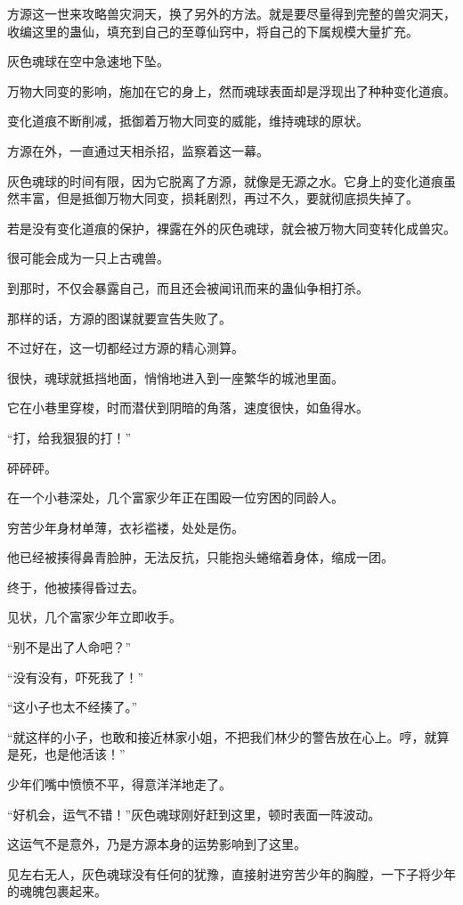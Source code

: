\begin{this_body}
方源这一世来攻略兽灾洞天，换了另外的方法。就是要尽量得到完整的兽灾洞天，收编这里的蛊仙，填充到自己的至尊仙窍中，将自己的下属规模大量扩充。

灰色魂球在空中急速地下坠。

万物大同变的影响，施加在它的身上，然而魂球表面却是浮现出了种种变化道痕。

变化道痕不断削减，抵御着万物大同变的威能，维持魂球的原状。

方源在外，一直通过天相杀招，监察着这一幕。

灰色魂球的时间有限，因为它脱离了方源，就像是无源之水。它身上的变化道痕虽然丰富，但是抵御万物大同变，损耗剧烈，再过不久，要就彻底损失掉了。

若是没有变化道痕的保护，裸露在外的灰色魂球，就会被万物大同变转化成兽灾。

很可能会成为一只上古魂兽。

到那时，不仅会暴露自己，而且还会被闻讯而来的蛊仙争相打杀。

那样的话，方源的图谋就要宣告失败了。

不过好在，这一切都经过方源的精心测算。

很快，魂球就抵挡地面，悄悄地进入到一座繁华的城池里面。

它在小巷里穿梭，时而潜伏到阴暗的角落，速度很快，如鱼得水。

“打，给我狠狠的打！”

砰砰砰。

在一个小巷深处，几个富家少年正在围殴一位穷困的同龄人。

穷苦少年身材单薄，衣衫褴褛，处处是伤。

他已经被揍得鼻青脸肿，无法反抗，只能抱头蜷缩着身体，缩成一团。

终于，他被揍得昏过去。

见状，几个富家少年立即收手。

“别不是出了人命吧？”

“没有没有，吓死我了！”

“这小子也太不经揍了。”

“就这样的小子，也敢和接近林家小姐，不把我们林少的警告放在心上。哼，就算是死，也是他活该！”

少年们嘴中愤愤不平，得意洋洋地走了。

“好机会，运气不错！”灰色魂球刚好赶到这里，顿时表面一阵波动。

这运气不是意外，乃是方源本身的运势影响到了这里。

见左右无人，灰色魂球没有任何的犹豫，直接射进穷苦少年的胸膛，一下子将少年的魂魄包裹起来。


\end{this_body}
